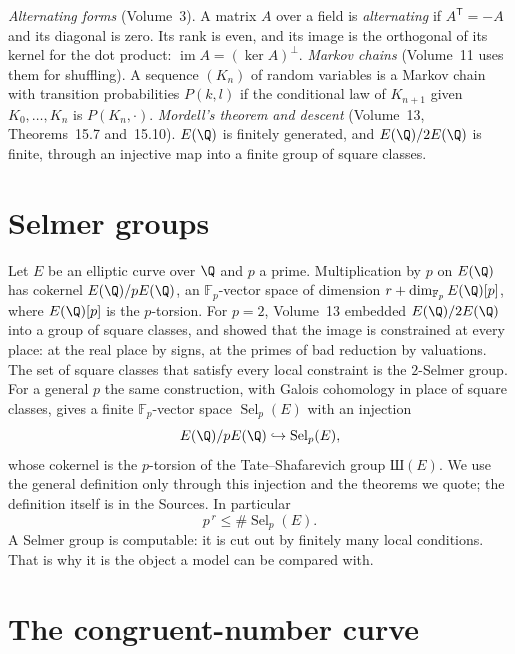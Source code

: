 \begin{reminder}
\emph{Alternating forms} (Volume~3). A matrix $A$ over a field is \emph{alternating} if $A^{\mathsf T}=-A$ and its diagonal is zero. Its rank is even, and its image is the orthogonal of its kernel for the dot product: $\operatorname{im}A=(\ker A)^\perp$.
\emph{Markov chains} (Volume~11 uses them for shuffling). A sequence $(K_n)$ of random variables is a Markov chain with transition probabilities $P(k,l)$ if the conditional law of $K_{n+1}$ given $K_0,\dots,K_n$ is $P(K_n,\cdot)$.
\emph{Mordell's theorem and descent} (Volume~13, Theorems~15.7 and~15.10). $E(\Q)$ is finitely generated, and $E(\Q)/2E(\Q)$ is finite, through an injective map into a finite group of square classes.
\end{reminder}

\section{Selmer groups}

Let $E$ be an elliptic curve over $\Q$ and $p$ a prime. Multiplication by $p$ on $E(\Q)$ has cokernel $E(\Q)/pE(\Q)$, an $\mathbb F_p$-vector space of dimension $r+\dim_{\mathbb F_p}E(\Q)[p]$, where $E(\Q)[p]$ is the $p$-torsion. For $p=2$, Volume~13 embedded $E(\Q)/2E(\Q)$ into a group of square classes, and showed that the image is constrained at every place: at the real place by signs, at the primes of bad reduction by valuations. The set of square classes that satisfy every local constraint is the $2$-Selmer group. For a general $p$ the same construction, with Galois cohomology in place of square classes, gives a finite $\mathbb F_p$-vector space $\operatorname{Sel}_p(E)$ with an injection
\[
E(\Q)/pE(\Q)\hookrightarrow\operatorname{Sel}_p(E),
\]
whose cokernel is the $p$-torsion of the Tate--Shafarevich group $\text{Ш}(E)$. We use the general definition only through this injection and the theorems we quote; the definition itself is in the Sources. In particular
\begin{equation}\label{eq:selmerbound}
p^{\,r}\le\#\operatorname{Sel}_p(E).
\end{equation}
A Selmer group is computable: it is cut out by finitely many local conditions. That is why it is the object a model can be compared with.

\section{The congruent-number curve}

